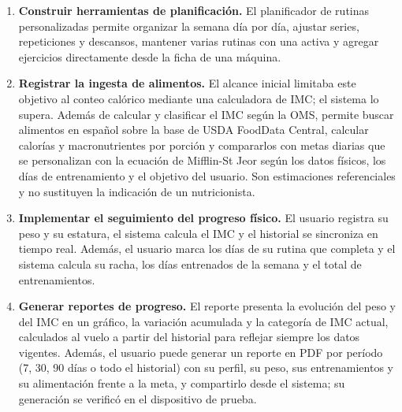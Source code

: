 \begin{enumerate}[label=\textbf{OE\arabic*.}, leftmargin=3.2em]
    de variables de carga y de división semanal, y que se ajusta con la edad,
    el IMC y los días disponibles del usuario. Sobre esas reglas se entrenó un
    modelo de TensorFlow Lite que decide la plantilla semanal y el esquema de
    carga y se ejecuta en el dispositivo; si su confianza es menor que 0,6 o
    falla, la aplicación usa las reglas. Como no existen datos de usuarios
    reales con resultados conocidos, el modelo se entrenó con 60\,000 perfiles
    sintéticos etiquetados por las propias reglas: reproduce las reglas con un
    99,8\,\% de exactitud, pero eso mide su fidelidad al criterio experto y no
    demuestra que sus rutinas sean mejores para los usuarios. Las pruebas
    sobre las doce combinaciones de objetivo y nivel confirmaron que cada
    rutina generada respeta las reglas.
    \item \textbf{Construir herramientas de planificación.} El planificador
    de rutinas personalizadas permite organizar la semana día por día, ajustar
    series, repeticiones y descansos, mantener varias rutinas con una activa y
    agregar ejercicios directamente desde la ficha de una máquina.
    \item \textbf{Registrar la ingesta de alimentos.} El alcance inicial
    limitaba este objetivo al conteo calórico mediante una calculadora de IMC;
    el sistema lo supera. Además de calcular y clasificar el IMC según la OMS,
    permite buscar alimentos en español sobre la base de USDA FoodData Central,
    calcular calorías y macronutrientes por porción y compararlos con metas
    diarias que se personalizan con la ecuación de Mifflin-St Jeor según los
    datos físicos, los días de entrenamiento y el objetivo del usuario. Son
    estimaciones referenciales y no sustituyen la indicación de un
    nutricionista.
    \item \textbf{Implementar el seguimiento del progreso físico.} El usuario
    registra su peso y su estatura, el sistema calcula el IMC y el historial
    se sincroniza en tiempo real. Además, el usuario marca los días de su
    rutina que completa y el sistema calcula su racha, los días entrenados de
    la semana y el total de entrenamientos.
    \item \textbf{Generar reportes de progreso.} El reporte presenta la
    evolución del peso y del IMC en un gráfico, la variación acumulada y la
    categoría de IMC actual, calculados al vuelo a partir del historial para
    reflejar siempre los datos vigentes. Además, el usuario puede generar un
    reporte en PDF por período (7, 30, 90 días o todo el historial) con su
    perfil, su peso, sus entrenamientos y su alimentación frente a la meta, y
    compartirlo desde el sistema; su generación se verificó en el dispositivo
    de prueba.
\end{enumerate}

